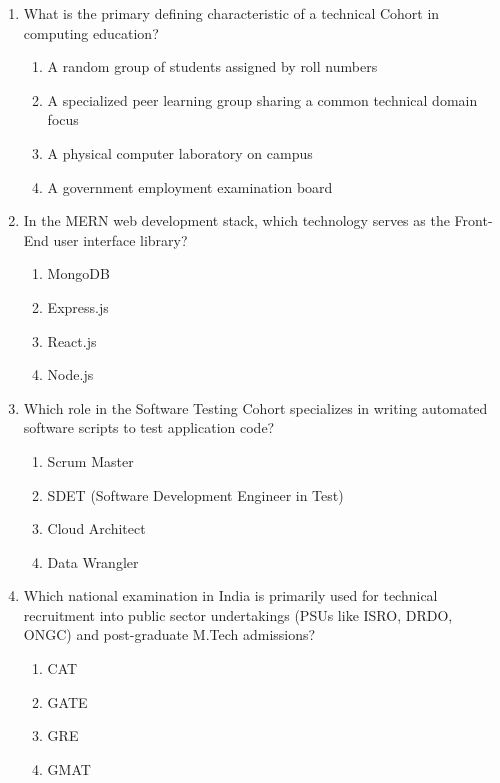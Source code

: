 \begin{enumerate}[leftmargin=1.5em]
    \item What is the primary defining characteristic of a technical Cohort in computing education?
    \begin{enumerate}[label=(\alph*)]
        \item A random group of students assigned by roll numbers
        \item A specialized peer learning group sharing a common technical domain focus
        \item A physical computer laboratory on campus
        \item A government employment examination board
    \end{enumerate}

    \item In the MERN web development stack, which technology serves as the Front-End user interface library?
    \begin{enumerate}[label=(\alph*)]
        \item MongoDB
        \item Express.js
        \item React.js
        \item Node.js
    \end{enumerate}

    \item Which role in the Software Testing Cohort specializes in writing automated software scripts to test application code?
    \begin{enumerate}[label=(\alph*)]
        \item Scrum Master
        \item SDET (Software Development Engineer in Test)
        \item Cloud Architect
        \item Data Wrangler
    \end{enumerate}

    \item Which national examination in India is primarily used for technical recruitment into public sector undertakings (PSUs like ISRO, DRDO, ONGC) and post-graduate M.Tech admissions?
    \begin{enumerate}[label=(\alph*)]
        \item CAT
        \item GATE
        \item GRE
        \item GMAT
    \end{enumerate}


\end{enumerate}

